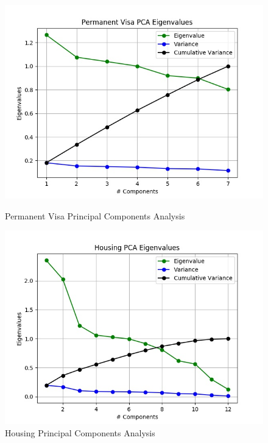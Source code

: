 \documentclass[h]{article}
\begin{document}
 \begin{figure}[H]
      \includegraphics[width=1\textwidth,keepaspectratio]{permanent_visa_pca_eigenvalues.jpg} 
      \caption*{Permanent Visa Principal Components Analysis } 
   \endminipage\hfill
      \includegraphics[width=1\textwidth,keepaspectratio]{housing_pca_eigenvalues.jpg} 
      \caption*{Housing Principal Components Analysis } 
   \endminipage\hfill
\end{figure}
\end{document}
